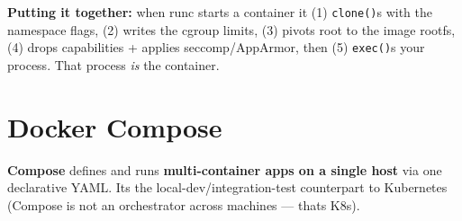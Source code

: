 \documentclass[11pt]{article}
\begin{document}
\textbf{Putting it together:} when runc starts a container it (1) \texttt{clone()}s with the namespace flags, (2) writes the cgroup limits, (3) pivots root to the image rootfs, (4) drops capabilities + applies seccomp/AppArmor, then (5) \texttt{exec()}s your process. That process \emph{is} the container.

\section{Docker Compose}\label{docker-compose}

\textbf{Compose} defines and runs \textbf{multi-container apps on a single host} via one declarative YAML. It\textquotesingle s the local-dev/integration-test counterpart to Kubernetes (Compose is not an orchestrator across machines --- that\textquotesingle s K8s).

\end{document}
